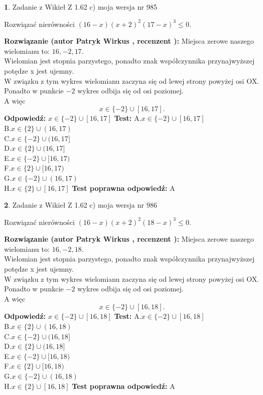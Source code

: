 \documentclass[12pt, a4paper]{article}
\theoremstyle{definition} %
\newtheorem{zad}{}
\newcommand{\zadStart}[1]{\begin{zad}#1\newline}
\newcommand{\zadStop}{\end{zad}}
\newcommand{\rozwStart}[2]{\noindent \textbf{Rozwiązanie (autor #1 , recenzent #2): }\newline}
\newcommand{\rozwStop}{\newline}
\newcommand{\odpStart}{\noindent \textbf{Odpowiedź:}\newline}
\newcommand{\odpStop}{\newline}
\newcommand{\testStart}{\noindent \textbf{Test:}\newline}
\newcommand{\testStop}{\newline}
\newcommand{\kluczStart}{\noindent \textbf{Test poprawna odpowiedź:}\newline}
\newcommand{\kluczStop}{\newline}
\begin{document}
\zadStart{Zadanie z Wikieł Z 1.62 c) moja wersja nr 985}

Rozwiązać nierówności $(16-x)(x+2)^{2}(17-x)^{3}\le0$.
\zadStop
\rozwStart{Patryk Wirkus}{}
Miejsca zerowe naszego wielomianu to: $16, -2, 17$.\\
Wielomian jest stopnia parzystego, ponadto znak współczynnika przy\linebreak najwyższej potędze x jest ujemny.\\ W związku z tym wykres wielomianu zaczyna się od lewej strony powyżej osi OX.\\
Ponadto w punkcie $-2$ wykres odbija się od osi poziomej.\\
A więc $$x \in \{-2\} \cup [16,17].$$
\rozwStop
\odpStart
$x \in \{-2\} \cup [16,17]$
\odpStop
\testStart
A.$x \in \{-2\} \cup [16,17]$\\
B.$x \in \{2\} \cup (16,17)$\\
C.$x \in \{-2\} \cup (16,17]$\\
D.$x \in \{2\} \cup (16,17]$\\
E.$x \in \{-2\} \cup [16,17)$\\
F.$x \in \{2\} \cup [16,17)$\\
G.$x \in \{-2\} \cup (16,17)$\\
H.$x \in \{2\} \cup [16,17]$
\testStop
\kluczStart
A
\kluczStop



\zadStart{Zadanie z Wikieł Z 1.62 c) moja wersja nr 986}

Rozwiązać nierówności $(16-x)(x+2)^{2}(18-x)^{3}\le0$.
\zadStop
\rozwStart{Patryk Wirkus}{}
Miejsca zerowe naszego wielomianu to: $16, -2, 18$.\\
Wielomian jest stopnia parzystego, ponadto znak współczynnika przy\linebreak najwyższej potędze x jest ujemny.\\ W związku z tym wykres wielomianu zaczyna się od lewej strony powyżej osi OX.\\
Ponadto w punkcie $-2$ wykres odbija się od osi poziomej.\\
A więc $$x \in \{-2\} \cup [16,18].$$
\rozwStop
\odpStart
$x \in \{-2\} \cup [16,18]$
\odpStop
\testStart
A.$x \in \{-2\} \cup [16,18]$\\
B.$x \in \{2\} \cup (16,18)$\\
C.$x \in \{-2\} \cup (16,18]$\\
D.$x \in \{2\} \cup (16,18]$\\
E.$x \in \{-2\} \cup [16,18)$\\
F.$x \in \{2\} \cup [16,18)$\\
G.$x \in \{-2\} \cup (16,18)$\\
H.$x \in \{2\} \cup [16,18]$
\testStop
\kluczStart
A
\kluczStop
\end{document}
